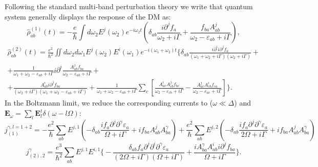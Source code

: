 \documentclass[aps, prb, superscriptaddress, longbibliography]{revtex4-2}
\renewcommand{\epsilon}{\varepsilon}
\numberwithin{equation}{section}
\begin{document}
Following the standard multi-band perturbation theory we write that quantum system generally displays the response of the DM as:
\begin{equation}
    \hat\rho^{(1)}_{ab}(t) = -\frac{e}{\hbar}\int d\omega_2E^{j}(\omega_2)e^{-i\omega_2 t}\left(\delta_{ab}\frac{i\partial^jf_a}{\omega_2+i\Gamma}+\frac{f_{ba}A^{j}_{ab}}{\omega_2-\varepsilon_{ab}+i\Gamma}\right),
\end{equation}
\begin{multline}
    \hat{\rho}^{(2)}_{ab}(t)=\frac{e^2}{\hbar^2}\iint d\omega_2d\omega_1E^{j}(\omega_2)E^{i}(\omega_1)e^{-i(\omega_1+\omega_2)t}\Bigg\{
    \delta_{ab}\frac{i\partial^ii\partial^jf_a}{(\omega_1+\omega_2+i\Gamma)(\omega_2+i\Gamma)}+\\+\frac{1}{\omega_1+\omega_2-\varepsilon_{ab}+i\Gamma}i\partial^{i}\frac{A^{j}_{ab}f_{ba}}{\omega_2-\varepsilon_{ab}+i\Gamma}+\\+\frac{A^{i}_{ab}i\partial^jf_{ba}}{(\omega_{2}+i\Gamma)(\omega_1+\omega_2-\varepsilon_{ab}+i\Gamma)}+\frac{1}{\omega_1+\omega_2-\varepsilon_{ab}+i\Gamma}\sum_c\left[\frac{A^i_{ac}A^{j}_{cb}f_{bc}}{\omega_2-\varepsilon_{cb}+i\Gamma}-\frac{A^j_{ac}A^{i}_{cb}f_{ca}}{\omega_2-\varepsilon_{ac}+i\Gamma}\right]\Bigg\}.
\end{multline}
In the Boltzmann limit, we reduce the corresponding currents to ($\omega\ll \Delta$) and $\mathbf{E}_\omega = \sum_l \mathbf{E}^t_{l}\delta(\omega-l\Omega)$:
\begin{equation}
    j^{\gamma, l = 1+2}_{(1)} =-\frac{e^2}{\hbar} \sum_{ab} E^{j, 1}\left(-\delta_{ab}\frac{if_a \partial^j\partial^\gamma \epsilon_a}{\Omega+i\Gamma}+if_{ba}A^{j}_{ab}A^\gamma_{ba}\right)+\frac{e^2}{\hbar} \sum_{ab} E^{j, 2}\left(-\delta_{ab}\frac{if_a \partial^j\partial^\gamma \epsilon_a}{2\Omega+i\Gamma}+if_{ba}A^{j}_{ab}A^\gamma_{ba}\right)
\end{equation}
\begin{equation}
    {j}_{(2),2}^\gamma=\frac{e^3}{\hbar^2}\sum_{ab} E^{j,1}E^{i,1}\Bigg\{
    -\frac{\delta_{ab}f_a \partial^j\partial^i\partial^\gamma \epsilon_a}{(2\Omega+i\Gamma)(\Omega+i\Gamma)}+\frac{iA^\gamma_{ba} A^{i}_{ab}i\partial^jf_{ba}}{\Omega+i\Gamma}\Bigg\}.
\end{equation}
\end{document}
